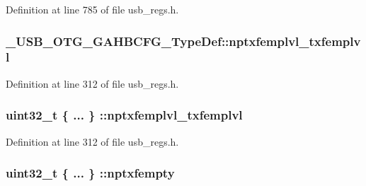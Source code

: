 Definition at line 785 of file usb\-\_\-regs.\-h.

\hypertarget{group___u_s_b___o_t_g___d_r_i_v_e_r_gae2801f85844ee69bae3fcb3a2e9d201e}{
\subsubsection[{nptxfemplvl\-\_\-txfemplvl}]{ \-\_\-\-U\-S\-B\-\_\-\-O\-T\-G\-\_\-\-G\-A\-H\-B\-C\-F\-G\-\_\-\-Type\-Def\-::nptxfemplvl\-\_\-txfemplvl}}\label{group___u_s_b___o_t_g___d_r_i_v_e_r_gae2801f85844ee69bae3fcb3a2e9d201e}


Definition at line 312 of file usb\-\_\-regs.\-h.

\hypertarget{group___u_s_b___o_t_g___d_r_i_v_e_r_ga1c1e4e2956aaf818af5d8680a62897d3}{
\subsubsection[{nptxfemplvl\-\_\-txfemplvl}]{\setlength{\rightskip}{0pt plus 5cm}uint32\-\_\-t \{ ... \} \-::nptxfemplvl\-\_\-txfemplvl}}\label{group___u_s_b___o_t_g___d_r_i_v_e_r_ga1c1e4e2956aaf818af5d8680a62897d3}


Definition at line 312 of file usb\-\_\-regs.\-h.

\hypertarget{group___u_s_b___o_t_g___d_r_i_v_e_r_gad56dd049ca095a1e9ec401960751de2c}{
\subsubsection[{nptxfempty}]{\setlength{\rightskip}{0pt plus 5cm}uint32\-\_\-t \{ ... \} \-::nptxfempty}}\label{group___u_s_b___o_t_g___d_r_i_v_e_r_gad56dd049ca095a1e9ec401960751de2c}


